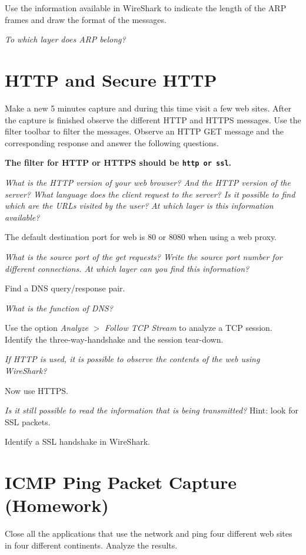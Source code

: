 Use the information available in WireShark to indicate the length of the ARP frames and draw the format of the messages.

\emph{To which layer does ARP belong?}

\section{HTTP and Secure HTTP}

Make a new 5 minutes capture and during this time visit a few web sites. After the capture is finished observe the different HTTP and HTTPS messages.
Use the filter toolbar to filter the messages. Observe an HTTP GET message and the corresponding response and answer the following questions.

\textbf{The filter for HTTP or HTTPS should be \texttt{http or ssl}.}

\emph{What is the HTTP version of your web browser? And the HTTP version of the server? What language does the client request to the server? Is it possible to find which are the URLs visited by the user? At which layer is this information available?}

The default destination port for web is 80 or 8080 when using a web proxy.

\emph{What is the source port of the get requests? Write the source port number for different connections. At which layer can you find this information?}

Find a DNS query/response pair.

\emph{What is the function of DNS?}

Use the option \emph{Analyze} $>$ \emph{Follow TCP Stream} to analyze a TCP session. Identify the three-way-handshake and the session tear-down.

\emph{If HTTP is used, it is possible to observe the contents of the web using WireShark?}

Now use HTTPS.

\emph{Is it still possible to read the information that is being transmitted?} Hint: look for SSL packets.

Identify a SSL handshake in WireShark.

\section{ICMP Ping Packet Capture (Homework)}

Close all the applications that use the network and ping four different web sites in four different continents. Analyze the results.

